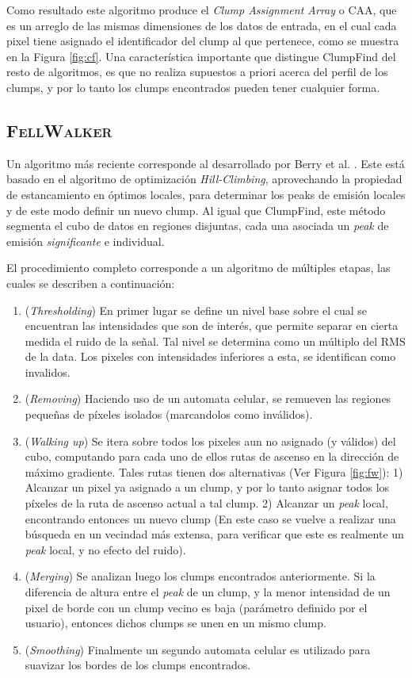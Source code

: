 \documentclass[letter, 11pt]{article}
\begin{document}
Como resultado este algoritmo produce el \textit{Clump Assignment Array} o CAA, que es un arreglo de las mismas dimensiones de los datos de entrada, en el cual cada pixel tiene asignado el identificador del clump al que pertenece, como se muestra en la Figura \ref{fig:cf}. Una característica importante que distingue ClumpFind del resto de algoritmos, es que no realiza supuestos a priori acerca del perfil de los clumps, y por lo tanto los clumps encontrados pueden tener cualquier forma.



\subsection{\textsc{FellWalker}}

Un algoritmo más reciente corresponde al desarrollado por Berry et al. \cite{Berry}. Este está basado en el algoritmo de optimización \textit{Hill-Climbing}, aprovechando la propiedad de estancamiento en óptimos locales, para determinar los peaks de emisión locales y de este modo definir un nuevo clump. Al igual que ClumpFind, este método segmenta el cubo de datos en regiones disjuntas, cada una asociada un \textit{peak} de emisión \textit{significante} e individual.

El procedimiento completo corresponde a un algoritmo de múltiples etapas, las cuales se describen a continuación:
\begin{enumerate}
     \item (\textit{Thresholding}) En primer lugar se define un nivel base sobre el cual se encuentran las intensidades que son de interés, que permite separar en cierta medida el ruido de la señal. Tal nivel se determina como un múltiplo del RMS de la data. Los pixeles con intensidades inferiores a esta, se identifican como invalidos.
     \item (\textit{Removing}) Haciendo uso de un automata celular, se remueven las regiones pequeñas de píxeles isolados (marcandolos como inválidos).
     \item (\textit{Walking up}) Se itera sobre todos los pixeles aun no asignado (y válidos) del cubo, computando para cada uno de ellos rutas de ascenso en la dirección de máximo gradiente. Tales rutas tienen dos alternativas (Ver Figura \ref{fig:fw}): 1) Alcanzar un pixel ya asignado a un clump, y por lo tanto asignar todos los píxeles de la ruta de ascenso actual a tal clump. 2) Alcanzar un \textit{peak} local, encontrando entonces un nuevo clump (En este caso se vuelve a realizar una búsqueda en un vecindad más extensa, para verificar que este es realmente un \textit{peak} local, y no efecto del ruido).
     \item (\textit{Merging}) Se analizan luego los clumps encontrados anteriormente. Si la diferencia de altura entre el \textit{peak} de un clump, y la menor intensidad de un pixel de borde con un clump vecino es baja (parámetro definido por el usuario), entonces dichos clumps se unen en un mismo clump.
     \item (\textit{Smoothing}) Finalmente un segundo automata celular es utilizado para suavizar los bordes de los clumps encontrados.
\end{enumerate}
\end{document}
